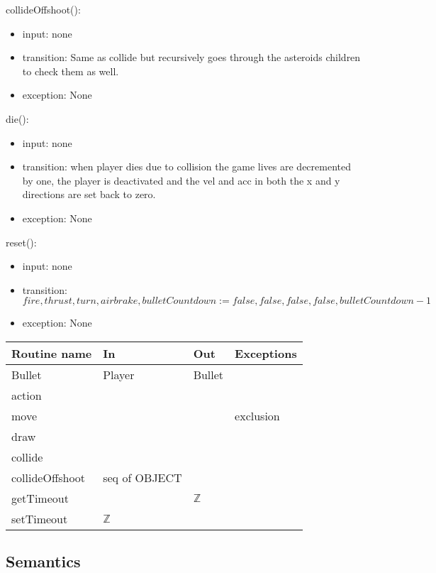 \documentclass[12pt]{article}
\begin{document}
\noindent collideOffshoot():
\begin{itemize}
  \item input: none
  \item transition: Same as collide but recursively goes through the asteroids children to check them as well.
  \item exception: None
\end{itemize}

\noindent die():
\begin{itemize}
  \item input: none
  \item transition: when player dies due to collision the game lives are decremented by one, the player is deactivated and the vel and acc in both the x and y directions are set back to zero.
  \item exception: None
\end{itemize}

\noindent reset():
\begin{itemize}
  \item input: none
  \item transition: $fire, thrust, turn, airbrake, bulletCountdown := false, false, false, false, bulletCountdown - 1$
  \item exception: None
\end{itemize}

\newpage

\begin{tabular}{| l | l | l | l |}
    \hline
    \textbf{Routine name} & \textbf{In} & \textbf{Out} & \textbf{Exceptions}\\
    \hline
    Bullet & Player & Bullet & ~\\
    \hline
    action & ~ & ~ & ~\\
    \hline
    move & ~ & ~ & exclusion\\
    \hline
    draw & ~ & ~ & ~\\
    \hline
    collide & ~ & ~ & ~\\
    \hline
    collideOffshoot & seq of OBJECT & ~ & ~\\
    \hline
    getTimeout & ~ & $\mathbb{Z}$ & ~\\
    \hline
    setTimeout & $\mathbb{Z}$ & ~ & ~\\
    \hline

\end{tabular}

\subsection* {Semantics}
\end{document}
